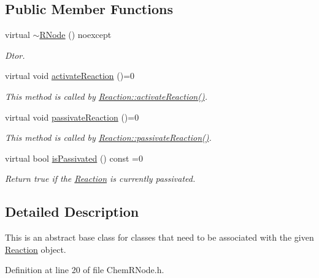 \subsection*{Public Member Functions}
\begin{DoxyCompactItemize}
\item 
virtual \hyperlink{classRNode_a7bc34189256f521f61e744282f74f27c}{$\sim$\+R\+Node} () noexcept
\begin{DoxyCompactList}\small\item\em Dtor. \end{DoxyCompactList}\item 
virtual void \hyperlink{classRNode_ae637a64362ad0ac7aab6e71abfafda57}{activate\+Reaction} ()=0
\begin{DoxyCompactList}\small\item\em This method is called by \hyperlink{classReactionBase_a1342fd46632e7d5c52d5cd6abe04d67f}{Reaction\+::activate\+Reaction()}. \end{DoxyCompactList}\item 
virtual void \hyperlink{classRNode_a4b3254697c3ddc7baaff8106c84986df}{passivate\+Reaction} ()=0
\begin{DoxyCompactList}\small\item\em This method is called by \hyperlink{classReactionBase_a90e7fe3533314f36ae386c308235c372}{Reaction\+::passivate\+Reaction()}. \end{DoxyCompactList}\item 
virtual bool \hyperlink{classRNode_abdf414a4ac9701ea0731d9a3f989d05f}{is\+Passivated} () const =0
\begin{DoxyCompactList}\small\item\em Return true if the \hyperlink{classReaction}{Reaction} is currently passivated. \end{DoxyCompactList}\end{DoxyCompactItemize}


\subsection{Detailed Description}
This is an abstract base class for classes that need to be associated with the given \hyperlink{classReaction}{Reaction} object. 

Definition at line 20 of file Chem\+R\+Node.\+h.



